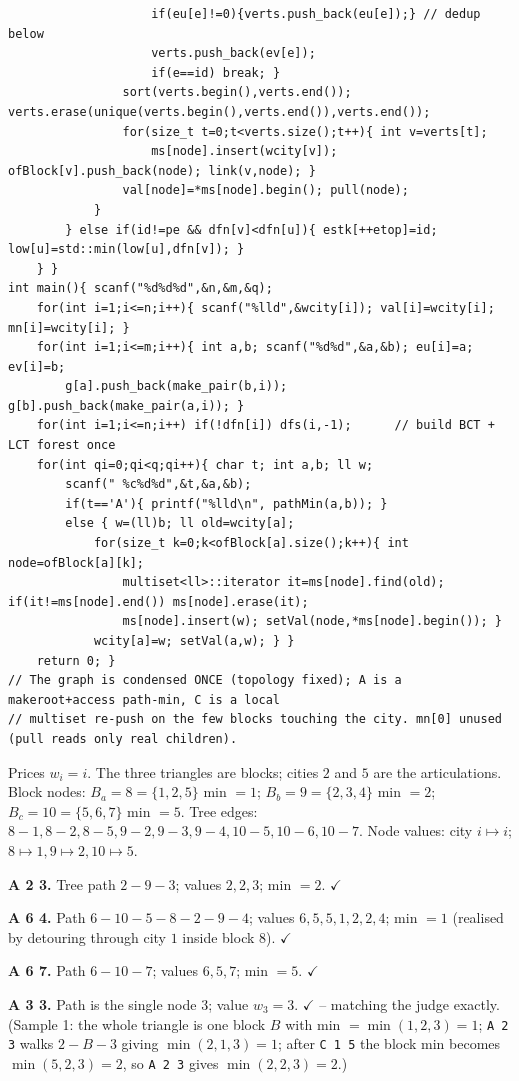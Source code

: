 \begin{lstlisting}
                    if(eu[e]!=0){verts.push_back(eu[e]);} // dedup below
                    verts.push_back(ev[e]);
                    if(e==id) break; }
                sort(verts.begin(),verts.end()); verts.erase(unique(verts.begin(),verts.end()),verts.end());
                for(size_t t=0;t<verts.size();t++){ int v=verts[t];
                    ms[node].insert(wcity[v]); ofBlock[v].push_back(node); link(v,node); }
                val[node]=*ms[node].begin(); pull(node);
            }
        } else if(id!=pe && dfn[v]<dfn[u]){ estk[++etop]=id; low[u]=std::min(low[u],dfn[v]); }
    } }
int main(){ scanf("%d%d%d",&n,&m,&q);
    for(int i=1;i<=n;i++){ scanf("%lld",&wcity[i]); val[i]=wcity[i]; mn[i]=wcity[i]; }
    for(int i=1;i<=m;i++){ int a,b; scanf("%d%d",&a,&b); eu[i]=a; ev[i]=b;
        g[a].push_back(make_pair(b,i)); g[b].push_back(make_pair(a,i)); }
    for(int i=1;i<=n;i++) if(!dfn[i]) dfs(i,-1);      // build BCT + LCT forest once
    for(int qi=0;qi<q;qi++){ char t; int a,b; ll w;
        scanf(" %c%d%d",&t,&a,&b);
        if(t=='A'){ printf("%lld\n", pathMin(a,b)); }
        else { w=(ll)b; ll old=wcity[a];
            for(size_t k=0;k<ofBlock[a].size();k++){ int node=ofBlock[a][k];
                multiset<ll>::iterator it=ms[node].find(old); if(it!=ms[node].end()) ms[node].erase(it);
                ms[node].insert(w); setVal(node,*ms[node].begin()); }
            wcity[a]=w; setVal(a,w); } }
    return 0; }
// The graph is condensed ONCE (topology fixed); A is a makeroot+access path-min, C is a local
// multiset re-push on the few blocks touching the city. mn[0] unused (pull reads only real children).
\end{lstlisting}

\begin{tracebox}
Prices \(w_i=i\). The three triangles are blocks; cities \(2\) and \(5\) are the articulations.
Block nodes: \(B_a{=}8=\{1,2,5\}\) min \(=1\); \(B_b{=}9=\{2,3,4\}\) min \(=2\);
\(B_c{=}10=\{5,6,7\}\) min \(=5\). Tree edges: \(8\!-\!1,8\!-\!2,8\!-\!5,9\!-\!2,9\!-\!3,9\!-\!4,
10\!-\!5,10\!-\!6,10\!-\!7\). Node values: city \(i\mapsto i\); \(8\mapsto1,9\mapsto2,10\mapsto5\).

\textbf{A 2 3.} Tree path \(2\!-\!9\!-\!3\); values \(2,2,3\); min \(=\boxed{2}\). \(\checkmark\)

\textbf{A 6 4.} Path \(6\!-\!10\!-\!5\!-\!8\!-\!2\!-\!9\!-\!4\); values \(6,5,5,1,2,2,4\);
min \(=\boxed{1}\) (realised by detouring through city \(1\) inside block \(8\)). \(\checkmark\)

\textbf{A 6 7.} Path \(6\!-\!10\!-\!7\); values \(6,5,7\); min \(=\boxed{5}\). \(\checkmark\)

\textbf{A 3 3.} Path is the single node \(3\); value \(w_3=\boxed{3}\). \(\checkmark\) -- matching the
judge exactly. (Sample 1: the whole triangle is one block \(B\) with min \(=\min(1,2,3)=1\);
\texttt{A 2 3} walks \(2\!-\!B\!-\!3\) giving \(\min(2,1,3)=1\); after \texttt{C 1 5} the block min
becomes \(\min(5,2,3)=2\), so \texttt{A 2 3} gives \(\min(2,2,3)=2\).)
\end{tracebox}


